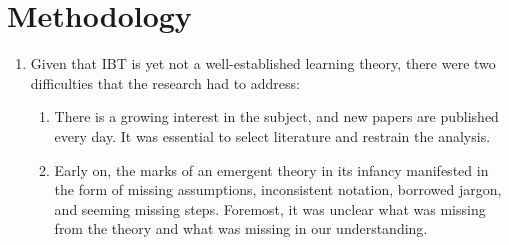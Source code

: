 \documentclass[
  letterpaper,
  12pt,
  british]{tufte-book}
\theoremstyle{plain}
\theoremstyle{plain}
\theoremstyle{definition}
\theoremstyle{remark}
\begin{document}
\hypertarget{methodology}{%
\section{Methodology}\label{methodology}}

\begin{enumerate}
\def\labelenumi{\arabic{enumi}.}
\item
  Given that {IBT} is yet not a well-established learning theory, there
  were two difficulties that the research had to address:

  \begin{enumerate}
  \def\labelenumii{\arabic{enumii}.}
  \item
    There is a growing interest in the subject, and new papers are
    published every day. It was essential to select literature and
    restrain the analysis.
  \item
    Early on, the marks of an emergent theory in its infancy manifested
    in the form of missing assumptions, inconsistent notation, borrowed
    jargon, and seeming missing steps. Foremost, it was unclear what was
    missing from the theory and what was missing in our understanding.
  \end{enumerate}


\end{enumerate}
\end{document}
